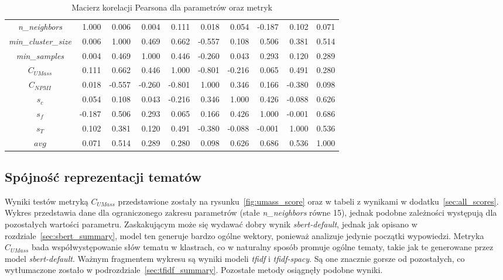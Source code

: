 	\begin{table}[htb]
		\caption{Macierz korelacji Pearsona dla parametrów oraz metryk}\label{tab:corr}
		\centering
		\small
		\begin{tabular}{c|rrrrrrrrr}	%
			\toprule
			{} &  \rotatebox[origin=c]{90}{\emph{n\_neighbors}} & \rotatebox[origin=c]{90}{\emph{min\_cluster\_size}} & \rotatebox[origin=c]{90}{\emph{min\_samples}} & \rotatebox[origin=c]{90}{\(C_{UMass}\)} & \rotatebox[origin=c]{90}{\(C_{NPMI}\)} & \rotatebox[origin=c]{90}{\(s_c\)} & \rotatebox[origin=c]{90}{\(s_f\)} & \rotatebox[origin=c]{90}{\(s_T\)} & \rotatebox[origin=c]{90}{\(avg\)} \\
			\midrule
			\emph{n\_neighbors}					&  1.000 &  0.006 &  0.004 &  0.111 &  0.018 &  0.054 & -0.187 &  0.102 &  0.071 \\
			\emph{min\_cluster\_size}		&  0.006 &  1.000 &  0.469 &  0.662 & -0.557 &  0.108 &  0.506 &  0.381 &  0.514 \\
			\emph{min\_samples}					&  0.004 &  0.469 &  1.000 &  0.446 & -0.260 &  0.043 &  0.293 &  0.120 &  0.289 \\
			\(C_{UMass}\)								&  0.111 &  0.662 &  0.446 &  1.000 & -0.801 & -0.216 &  0.065 &  0.491 &  0.280 \\
			\(C_{NPMI}\)								&  0.018 & -0.557 & -0.260 & -0.801 &  1.000 &  0.346 &  0.166 & -0.380 &  0.098 \\
			\(s_c\)											&  0.054 &  0.108 &  0.043 & -0.216 &  0.346 &  1.000 &  0.426 & -0.088 &  0.626 \\
			\(s_f\)											& -0.187 &  0.506 &  0.293 &  0.065 &  0.166 &  0.426 &  1.000 & -0.001 &  0.686 \\
			\(s_T\)											&  0.102 &  0.381 &  0.120 &  0.491 & -0.380 & -0.088 & -0.001 &  1.000 &  0.536 \\
			\(avg\)											&  0.071 &  0.514 &  0.289 &  0.280 &  0.098 &  0.626 &  0.686 &  0.536 &  1.000 \\
			\bottomrule
		\end{tabular}			
	\end{table}

	\subsection{Spójność reprezentacji tematów}
		Wyniki testów metryką \(C_{UMass}\) przedstawione zostały na rysunku~\ref{fig:umass_score} oraz w tabeli z wynikami w dodatku~\ref{sec:all_scores}.
		Wykres przedstawia dane dla ograniczonego zakresu parametrów (stałe \emph{n\_neighbors} równe 15), jednak podobne zależności występują dla pozostałych wartości parametru.
		Zaskakującym może się wydawać dobry wynik \emph{sbert-default}, jednak jak opisano w rozdziale~\ref{sec:sbert_summary},
			model ten generuje bardzo ogólne wektory, ponieważ analizuje jedynie początki wypowiedzi.
		Metryka \(C_{UMass}\) bada współwystępowanie słów tematu w klastrach, co w naturalny sposób promuje ogólne tematy,
			takie jak te generowane przez model \emph{sbert-default}.
		Ważnym fragmentem wykresu są wyniki modeli \emph{tfidf} i \emph{tfidf-spacy}.
		Są one znacznie gorsze od pozostałych, co wytłumaczone zostało w podrozdziale~\ref{sec:tfidf_summary}.
		Pozostałe metody osiągnęły podobne wyniki.
		
